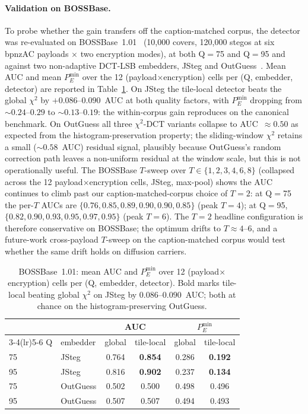 \documentclass[10pt,twocolumn,a4paper]{article}
\begin{document}
\paragraph{Validation on BOSSBase.}
\label{sec:tiled-validation}
To probe whether the gain transfers off the caption-matched corpus, the detector was re-evaluated on BOSSBase~1.01~\cite{bas2011boss} (10{,}000 covers, 120{,}000 stegos at six bpnzAC payloads $\times$ two encryption modes), at both Q$=$75 and Q$=$95 and against two non-adaptive DCT-LSB embedders, JSteg and OutGuess~\cite{provos2001outguess}.  Mean AUC and mean $P_E^{\min}$ over the 12 (payload$\times$encryption) cells per (Q, embedder, detector) are reported in Table~\ref{tab:bossbase-tile-local}.  On JSteg the tile-local detector beats the global $\chi^2$ by $+0.086$--$0.090$~AUC at both quality factors, with $P_E^{\min}$ dropping from $\sim 0.24$--$0.29$ to $\sim 0.13$--$0.19$: the within-corpus gain reproduces on the canonical benchmark.  On OutGuess all three $\chi^2$-DCT variants collapse to AUC~$\approx 0.50$ as expected from the histogram-preservation property; the sliding-window $\chi^2$ retains a small ($\sim 0.58$~AUC) residual signal, plausibly because OutGuess's random correction path leaves a non-uniform residual at the window scale, but this is not operationally useful.  The BOSSBase $T$-sweep over $T\!\in\!\{1,2,3,4,6,8\}$ (collapsed across the 12 payload$\times$encryption cells, JSteg, max-pool) shows the AUC continues to climb past our caption-matched-corpus choice of $T\!=\!2$: at Q$=$75 the per-$T$ AUCs are $\{0.76, 0.85, 0.89, 0.90, 0.90, 0.85\}$ (peak $T\!=\!4$); at Q$=$95, $\{0.82, 0.90, 0.93, 0.95, 0.97, 0.95\}$ (peak $T\!=\!6$). The $T\!=\!2$ headline configuration is therefore conservative on BOSSBase; the optimum drifts to $T\!\approx\!4$--$6$, and a future-work cross-payload $T$-sweep on the caption-matched corpus would test whether the same drift holds on diffusion carriers.

\begin{table}[!t]
\centering\footnotesize
\caption{BOSSBase~1.01: mean AUC and $P_E^{\min}$ over 12 (payload$\times$encryption) cells per (Q, embedder, detector). Bold marks tile-local beating global $\chi^2$ on JSteg by $0.086$--$0.090$~AUC; both at chance on the histogram-preserving OutGuess.}
\label{tab:bossbase-tile-local}
\begin{tabular}{llcccc}
\toprule
 & & \multicolumn{2}{c}{AUC} & \multicolumn{2}{c}{$P_E^{\min}$} \\
\cmidrule(lr){3-4}\cmidrule(lr){5-6}
Q & embedder & global & tile-local & global & tile-local \\
\midrule
75 & JSteg    & 0.764 & \textbf{0.854} & 0.286 & \textbf{0.192} \\
95 & JSteg    & 0.816 & \textbf{0.902} & 0.237 & \textbf{0.134} \\
75 & OutGuess & 0.502 & 0.500 & 0.498 & 0.496 \\
95 & OutGuess & 0.507 & 0.507 & 0.494 & 0.493 \\
\bottomrule
\end{tabular}
\end{table}
\end{document}
